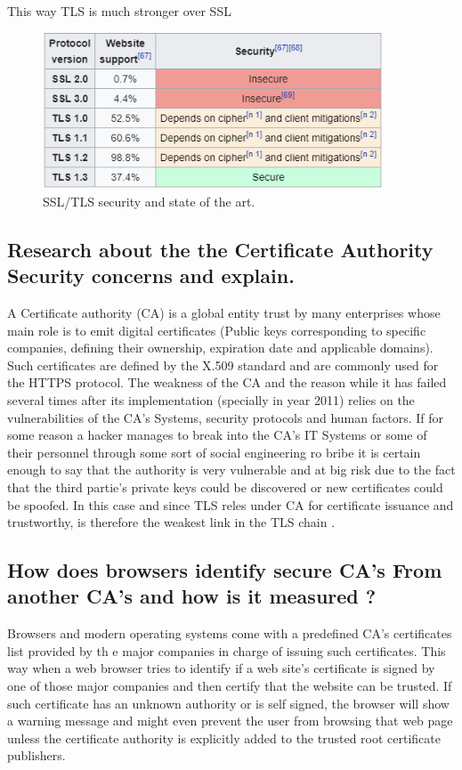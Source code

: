 \documentclass[letterpaper,12pt]{article}
\begin{document}
This way TLS is much stronger over SSL
\begin{figure}[H]
    \centering
    \includegraphics[width=0.9\textwidth]{assets/tlsssl.png}
    \caption{SSL/TLS security and state of the art.\cite{WIKI_TLS}}
    \label{fig:SSLTLS}
\end{figure}

\subsection{Research about the the Certificate Authority Security concerns and explain.}
A Certificate authority (CA) is a global entity trust by many enterprises whose main role is to emit digital certificates (Public keys corresponding to specific companies, defining their ownership, expiration date and applicable domains). Such certificates are defined by the X.509 standard and are commonly used for the HTTPS protocol. The weakness of the CA and the reason while it has failed several times after its implementation (specially in year 2011) relies on the vulnerabilities of the CA's Systems, security protocols and human factors. If for some reason a hacker manages to break into the CA's IT Systems or some of their personnel through some sort of social engineering ro bribe it is certain enough to say that the authority is very vulnerable and at big risk due to the fact that the third partie's private keys could be discovered or new certificates could be spoofed. In this case and since TLS reles under CA for certificate issuance and trustworthy, is therefore the weakest link in the TLS chain \cite{CA_INFOSEC}.
\subsection{How does browsers identify secure CA's From another CA's and how is it measured ?}
Browsers and modern operating systems come with a predefined CA's certificates list provided by th e major companies in charge of issuing such certificates. This way when a web browser tries to identify if a web site's certificate is signed by one of those major companies and then certify that the website can be trusted. If such certificate has an unknown authority or is self signed, the browser will show a warning message and might even prevent the user from browsing that web page unless the certificate authority is explicitly added to the trusted root certificate publishers.
\end{document}
